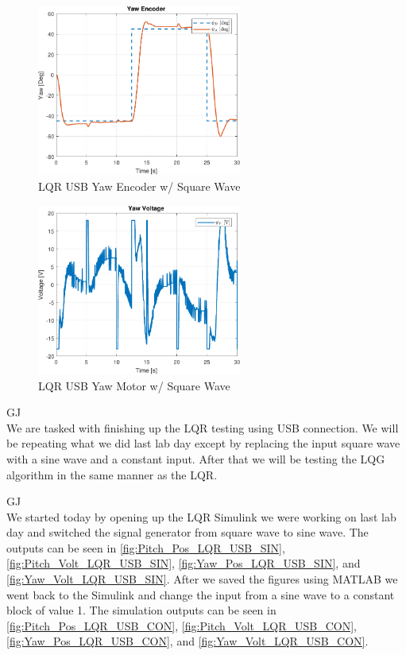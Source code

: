 \documentclass[fontsize=11pt, %
                             paper=letter, %
                             openany, %
                             captions=tableheading,
                             index=totoc,
                             hyperref]{labbook}
\begin{document}
\begin{addmargin}[0cm]{0cm}
\begin{figure}[h]
  \centering
  \includegraphics[width=0.6\textwidth]{figs/matlab/LQR_USB/Yaw_Pos_LQR_USB_SQU}
  \caption{LQR USB Yaw Encoder w/ Square Wave}
  \label{fig:Yaw_Pos_LQR_USB_SQU}
\end{figure}

\begin{figure}[h]
  \centering
  \includegraphics[width=0.6\textwidth]{figs/matlab/LQR_USB/Yaw_Volt_LQR_USB_SQU}
  \caption{LQR USB Yaw Motor w/ Square Wave}
  \label{fig:Yaw_Volt_LQR_USB_SQU}
\end{figure}


GJ\\
We are tasked with finishing up the LQR testing using USB connection.  We will be repeating what we did last lab day except by replacing the input square wave with a sine wave and a constant input.  After that we will be testing the LQG algorithm in the same manner as the LQR.

GJ\\
We started today by opening up the LQR Simulink we were working on last lab day and switched the signal generator from square wave to sine wave.  The outputs can be seen in \autoref{fig:Pitch_Pos_LQR_USB_SIN}, \autoref{fig:Pitch_Volt_LQR_USB_SIN}, \autoref{fig:Yaw_Pos_LQR_USB_SIN}, and \autoref{fig:Yaw_Volt_LQR_USB_SIN}.  After we saved the figures using MATLAB we went back to the Simulink and change the input from a sine wave to a constant block of value 1.  The simulation outputs can be seen in \autoref{fig:Pitch_Pos_LQR_USB_CON}, \autoref{fig:Pitch_Volt_LQR_USB_CON}, \autoref{fig:Yaw_Pos_LQR_USB_CON}, and \autoref{fig:Yaw_Volt_LQR_USB_CON}.


\end{addmargin}
\end{document}
